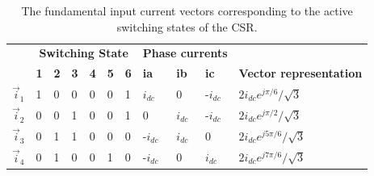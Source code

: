 \begin{table}[]
\caption{The fundamental input current vectors corresponding to the active switching states of the CSR.}
    \begin{tabular}{|l|l|l|l|l|l|l|l|l|l|l|}
    \hline
    \rowcolor[HTML]{EFEFEF}
    \multicolumn{1}{|c|}{\cellcolor[HTML]{EFEFEF}}                                & \multicolumn{6}{c|}{\cellcolor[HTML]{EFEFEF}\textbf{Switching State}}       & \multicolumn{3}{l|}{\cellcolor[HTML]{EFEFEF}\textbf{Phase currents}} & \multicolumn{1}{c|}{\cellcolor[HTML]{EFEFEF}}                                                 \\ \cline{2-10}
    \rowcolor[HTML]{EFEFEF}
    \multicolumn{1}{|c|}{\multirow{-2}{*}{\cellcolor[HTML]{EFEFEF}\textbf{Name}}} & \textbf{1} & \textbf{2} & \textbf{3} & \textbf{4} & \textbf{5} & \textbf{6} & \textbf{ia}           & \textbf{ib}           & \textbf{ic}          & \multicolumn{1}{c|}{\multirow{-2}{*}{\cellcolor[HTML]{EFEFEF}\textbf{Vector representation}}} \\ \hline
    $\vec{i}_1$                                                                           & 1          & 0          & 0          & 0          & 0          & 1          & $i_{dc}$                   & 0                     & -$i_{dc}$                 & $2i_{dc}e^{j\pi/6}/\sqrt{3}$                                                                                           \\ \hline
    $\vec{i}_2$                                                                            & 0          & 0          & 1          & 0          & 0          & 1          & 0                     & $i_{dc}$                   & -$i_{dc}$                 & $2i_{dc}e^{j\pi/2}/\sqrt{3}$                                                                                           \\ \hline
    $\vec{i}_3$                                                                            & 0          & 1          & 1          & 0          & 0          & 0          & -$i_{dc}$                  & $i_{dc}$                   & 0                    & $2i_{dc}e^{j5\pi/6}/\sqrt{3}$                                                                                          \\ \hline
    $\vec{i}_4$                                                                            & 0          & 1          & 0          & 0          & 1          & 0          & -$i_{dc}$                  & 0                     & $i_{dc}$                  & $2i_{dc}e^{j7\pi/6}/\sqrt{3}$                                                                                          \\ \hline

\end{tabular}
\end{table}
